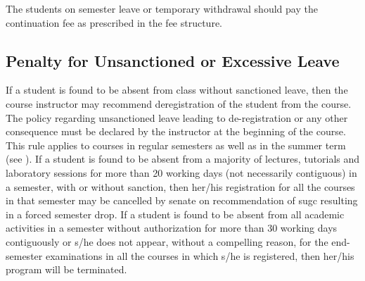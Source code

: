 The \glspl{student} on semester leave or temporary withdrawal should pay the continuation fee as prescribed in the fee structure.

\subsection{Penalty for Unsanctioned or Excessive Leave}

If a \gls{student} is found to be absent from class without sanctioned leave, then the course instructor may recommend deregistration of the \gls{student} from the course. The policy regarding unsanctioned leave leading to de-registration or any other consequence must be declared by the instructor at the beginning of the course. This rule applies to courses in regular semesters as well as in the summer term (see ). If a \gls{student} is found to be absent from a majority of lectures, tutorials and laboratory sessions for more than 20 working days (not necessarily contiguous) in a semester, with or without sanction, then her/his registration for all the courses in that semester may be cancelled by \gls{senate} on recommendation of \acrshort{sugc} resulting in a forced semester drop. If a \gls{student} is found to be absent from all academic activities in a semester without authorization for more than 30 working days contiguously or s/he does not appear, without a compelling reason, for the end-semester examinations in all the courses in which s/he is registered, then her/his program will be terminated.